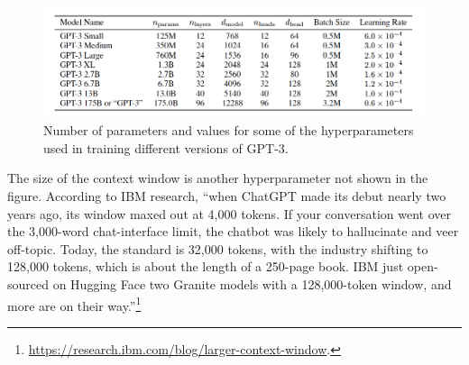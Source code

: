\begin{figure}[h]
\centering
\includegraphics[scale=.4]{./images/gpt3_params.png}
\caption[\url{https://arxiv.org/abs/2005.14165}.]{Number of parameters and values for some of the hyperparameters used in training different versions of GPT-3. }
\label{gptParams}
\end{figure}

The size of the context window is another hyperparameter not shown in the figure. According to IBM research, ``when ChatGPT made its debut nearly two years ago, its window maxed out at 4,000 tokens. If your conversation went over the 3,000-word chat-interface limit, the chatbot was likely to hallucinate and veer off-topic. Today, the standard is 32,000 tokens, with the industry shifting to 128,000 tokens, which is about the length of a 250-page book. IBM just open-sourced on Hugging Face two Granite models with a 128,000-token window, and more are on their way.''\footnote{\url{https://research.ibm.com/blog/larger-context-window}.}

%
%

